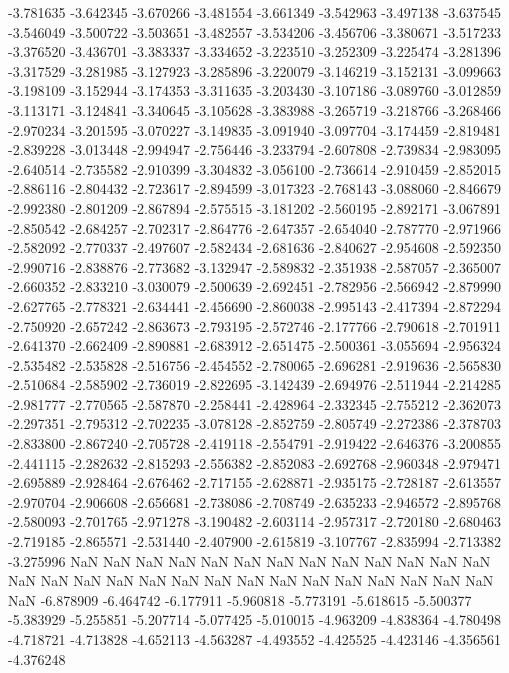 -3.781635
-3.642345
-3.670266
-3.481554
-3.661349
-3.542963
-3.497138
-3.637545
-3.546049
-3.500722
-3.503651
-3.482557
-3.534206
-3.456706
-3.380671
-3.517233
-3.376520
-3.436701
-3.383337
-3.334652
-3.223510
-3.252309
-3.225474
-3.281396
-3.317529
-3.281985
-3.127923
-3.285896
-3.220079
-3.146219
-3.152131
-3.099663
-3.198109
-3.152944
-3.174353
-3.311635
-3.203430
-3.107186
-3.089760
-3.012859
-3.113171
-3.124841
-3.340645
-3.105628
-3.383988
-3.265719
-3.218766
-3.268466
-2.970234
-3.201595
-3.070227
-3.149835
-3.091940
-3.097704
-3.174459
-2.819481
-2.839228
-3.013448
-2.994947
-2.756446
-3.233794
-2.607808
-2.739834
-2.983095
-2.640514
-2.735582
-2.910399
-3.304832
-3.056100
-2.736614
-2.910459
-2.852015
-2.886116
-2.804432
-2.723617
-2.894599
-3.017323
-2.768143
-3.088060
-2.846679
-2.992380
-2.801209
-2.867894
-2.575515
-3.181202
-2.560195
-2.892171
-3.067891
-2.850542
-2.684257
-2.702317
-2.864776
-2.647357
-2.654040
-2.787770
-2.971966
-2.582092
-2.770337
-2.497607
-2.582434
-2.681636
-2.840627
-2.954608
-2.592350
-2.990716
-2.838876
-2.773682
-3.132947
-2.589832
-2.351938
-2.587057
-2.365007
-2.660352
-2.833210
-3.030079
-2.500639
-2.692451
-2.782956
-2.566942
-2.879990
-2.627765
-2.778321
-2.634441
-2.456690
-2.860038
-2.995143
-2.417394
-2.872294
-2.750920
-2.657242
-2.863673
-2.793195
-2.572746
-2.177766
-2.790618
-2.701911
-2.641370
-2.662409
-2.890881
-2.683912
-2.651475
-2.500361
-3.055694
-2.956324
-2.535482
-2.535828
-2.516756
-2.454552
-2.780065
-2.696281
-2.919636
-2.565830
-2.510684
-2.585902
-2.736019
-2.822695
-3.142439
-2.694976
-2.511944
-2.214285
-2.981777
-2.770565
-2.587870
-2.258441
-2.428964
-2.332345
-2.755212
-2.362073
-2.297351
-2.795312
-2.702235
-3.078128
-2.852759
-2.805749
-2.272386
-2.378703
-2.833800
-2.867240
-2.705728
-2.419118
-2.554791
-2.919422
-2.646376
-3.200855
-2.441115
-2.282632
-2.815293
-2.556382
-2.852083
-2.692768
-2.960348
-2.979471
-2.695889
-2.928464
-2.676462
-2.717155
-2.628871
-2.935175
-2.728187
-2.613557
-2.970704
-2.906608
-2.656681
-2.738086
-2.708749
-2.635233
-2.946572
-2.895768
-2.580093
-2.701765
-2.971278
-3.190482
-2.603114
-2.957317
-2.720180
-2.680463
-2.719185
-2.865571
-2.531440
-2.407900
-2.615819
-3.107767
-2.835994
-2.713382
-3.275996
NaN
NaN
NaN
NaN
NaN
NaN
NaN
NaN
NaN
NaN
NaN
NaN
NaN
NaN
NaN
NaN
NaN
NaN
NaN
NaN
NaN
NaN
NaN
NaN
NaN
NaN
NaN
NaN
NaN
-6.878909
-6.464742
-6.177911
-5.960818
-5.773191
-5.618615
-5.500377
-5.383929
-5.255851
-5.207714
-5.077425
-5.010015
-4.963209
-4.838364
-4.780498
-4.718721
-4.713828
-4.652113
-4.563287
-4.493552
-4.425525
-4.423146
-4.356561
-4.376248
